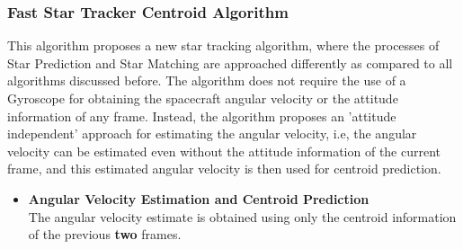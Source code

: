 \documentclass[../../main.tex]{subfiles}
\begin{document}
\subsubsection{Fast Star Tracker Centroid Algorithm} \label{fast_algorithm}
This algorithm proposes a new star tracking algorithm, where the processes of Star Prediction and Star Matching are approached differently as compared to all algorithms discussed before. The algorithm does not require the use of a Gyroscope for obtaining the spacecraft angular velocity or the attitude information of any frame. Instead, the algorithm proposes an 'attitude independent' approach for estimating the angular velocity, i.e, the angular velocity can be estimated even without the attitude information of the current frame, and this estimated angular velocity is then used for centroid prediction. 
\begin{itemize}
    \item \textbf{Angular Velocity Estimation and Centroid Prediction}\\ \label{slew_prediction}
    The angular velocity estimate is obtained using only the centroid information of the previous \textbf{two} frames. 

\end{itemize}
\end{document}

